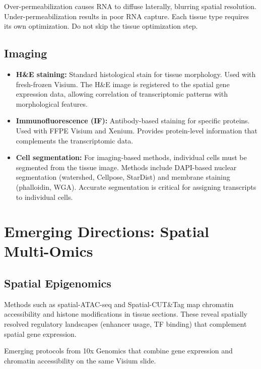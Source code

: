 \begin{warningbox}
Over-permeabilization causes RNA to diffuse laterally, blurring spatial
resolution. Under-permeabilization results in poor RNA capture. Each tissue
type requires its own optimization. Do not skip the tissue optimization step.
\end{warningbox}

\subsection{Imaging}

\begin{itemize}[nosep]
  \item \textbf{H\&E staining:} Standard histological stain for tissue
    morphology. Used with fresh-frozen Visium. The H\&E image is registered to
    the spatial gene expression data, allowing correlation of transcriptomic
    patterns with morphological features.
  \item \textbf{Immunofluorescence (IF):} Antibody-based staining for specific
    proteins. Used with FFPE Visium and Xenium. Provides protein-level
    information that complements the transcriptomic data.
  \item \textbf{Cell segmentation:} For imaging-based methods, individual cells
    must be segmented from the tissue image. Methods include DAPI-based nuclear
    segmentation (watershed, Cellpose, StarDist) and membrane staining
    (phalloidin, WGA). Accurate segmentation is critical for assigning
    transcripts to individual cells.
\end{itemize}


\section{Emerging Directions: Spatial Multi-Omics}
\label{sec:spatial:emerging}

\subsection{Spatial Epigenomics}

\begin{description}[style=nextline]
  \item[Spatial ATAC-seq] Methods such as spatial-ATAC-seq and
    Spatial-CUT\&Tag map chromatin accessibility and histone modifications
    in tissue sections. These reveal spatially resolved regulatory landscapes
    (enhancer usage, TF binding) that complement spatial gene expression.
  \item[10x Visium + ATAC] Emerging protocols from 10x Genomics that combine
    gene expression and chromatin accessibility on the same Visium slide.
\end{description}

